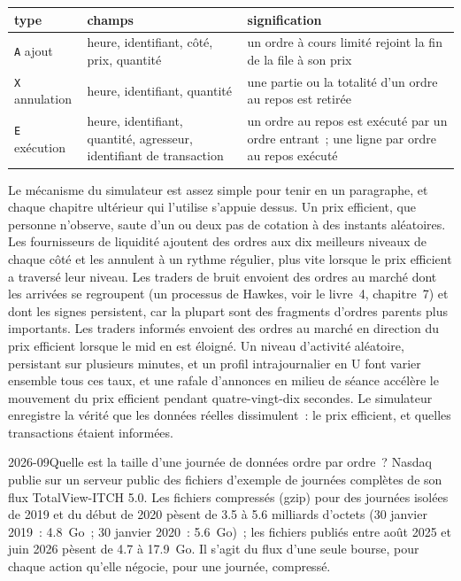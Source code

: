 \begin{center}
\small
\begin{tabular}{@{}lp{4.4cm}p{7.2cm}@{}}
\toprule
type & champs & signification \\
\midrule
\texttt{A} ajout & heure, identifiant, côté, prix, quantité & un ordre à cours limité rejoint la fin de la file à son prix \\
\texttt{X} annulation & heure, identifiant, quantité & une partie ou la totalité d'un ordre au repos est retirée \\
\texttt{E} exécution & heure, identifiant, quantité, agresseur, identifiant de transaction & un ordre au repos est exécuté par un ordre entrant~; une ligne par ordre au repos exécuté \\
\bottomrule
\end{tabular}
\end{center}

Le mécanisme du simulateur est assez simple pour tenir en un paragraphe, et chaque chapitre ultérieur qui l'utilise s'appuie dessus. Un
prix efficient, que personne n'observe, saute d'un ou deux pas de cotation à des instants aléatoires. Les fournisseurs de liquidité ajoutent des ordres aux dix meilleurs
niveaux de chaque côté et les annulent à un rythme régulier, plus vite lorsque le prix efficient a traversé leur niveau. Les traders de bruit
envoient des ordres au marché dont les arrivées se regroupent (un processus de Hawkes, voir le livre~4, chapitre~7) et dont les signes persistent,
car la plupart sont des fragments d'ordres parents plus importants. Les traders informés envoient des ordres au marché en direction du prix efficient lorsque le
mid en est éloigné. Un niveau d'activité aléatoire, persistant sur plusieurs minutes, et un profil intrajournalier en U font varier ensemble tous ces
taux, et une rafale d'annonces en milieu de séance accélère le mouvement du prix efficient pendant quatre-vingt-dix secondes. Le simulateur
enregistre la vérité que les données réelles dissimulent~: le prix efficient, et quelles transactions étaient informées.

\begin{dated}{2026-09}{Quelle est la taille d'une journée de données ordre par ordre~?}\label{dat:rs:market-data-for-research:itch}
Nasdaq publie sur un serveur public des fichiers d'exemple de journées complètes de son flux TotalView-ITCH 5.0. Les fichiers compressés (gzip) pour
des journées isolées de 2019 et du début de 2020 pèsent de 3.5 à 5.6 milliards d'octets (30 janvier 2019~: 4.8~Go~; 30 janvier 2020~: 5.6~Go)~; les
fichiers publiés entre août 2025 et juin 2026 pèsent de 4.7 à 17.9~Go. Il s'agit du flux d'une seule bourse, pour chaque action qu'elle négocie, pour
une journée, compressé.
\end{dated}

